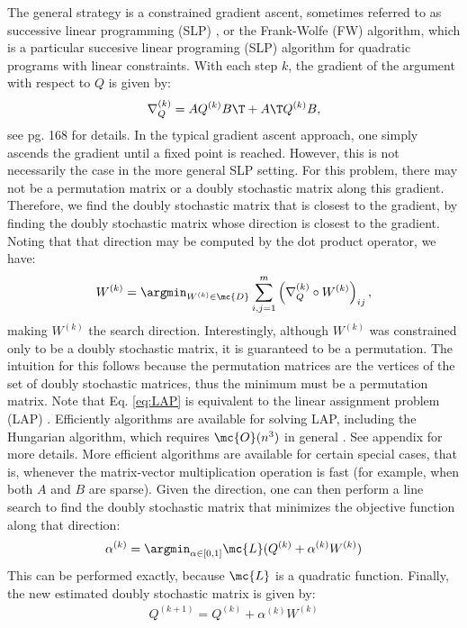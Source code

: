 The general strategy is a constrained gradient ascent, sometimes referred to as successive linear programming (SLP) \cite{}, or the Frank-Wolfe (FW) algorithm, which is a particular succesive linear programing (SLP) algorithm for quadratic programs with linear constraints.  With each step $k$, the gradient of the argument with respect to $Q$ is given by:
\begin{align} \label{eq:grad}
	\nabla_Q^{(k)} = A Q^{(k)} B\T + A\T Q^{(k)} B, 
\end{align}
see \cite{MDS} pg. 168 for details.  In the typical gradient ascent approach, one simply ascends the gradient until a fixed point is reached.  However, this is not necessarily the case in the more general SLP setting.  For this problem, there may not be a permutation matrix or a doubly stochastic matrix along this gradient.  Therefore, we find the doubly stochastic matrix that is closest to the gradient, by finding the doubly stochastic matrix whose direction is closest to the gradient.  Noting that that direction may be computed by the dot product operator, we have:
\begin{align}\label{eq:LAP}
	W^{(k)} = \argmin_{W^{(k)} \in \mc{D}} \sum_{i,j=1}^m 	\left( 	\nabla_Q^{(k)}\circ W^{(k)} \right)_{ij},
\end{align}
making $W^{(k)}$ the search direction.  Interestingly, although $W^{(k)}$ was constrained only to be a doubly stochastic matrix, it is guaranteed to be a permutation.   The intuition for this follows because the permutation matrices are the vertices of the set of doubly stochastic matrices,   thus the minimum must be a permutation matrix.  Note that Eq. \eqref{eq:LAP} is equivalent to the linear assignment problem (LAP) \cite{}.  Efficiently algorithms are available for solving LAP, including the Hungarian algorithm, which requires $\mc{O}(n^3)$ in general \cite{}. See appendix for more details.  More efficient algorithms are available for certain special cases, that is, whenever the matrix-vector multiplication operation is fast (for example, when both $A$ and $B$ are sparse).  Given the direction, one can then perform a line search to find the doubly stochastic matrix that minimizes the objective function along that direction:
\begin{align}
	\alpha^{(k)} = \argmin_{\alpha \in [0,1]} \mc{L}(Q^{(k)} + \alpha^{(k)} W^{(k)})
\end{align}
This can be performed exactly, because $\mc{L}$ is a quadratic function.  Finally, the new estimated doubly stochastic matrix is given by:
\begin{align}\label{eq:update}
	Q^{(k+1)} = Q^{(k)} + \alpha^{(k)} W^{(k)}
\end{align}
